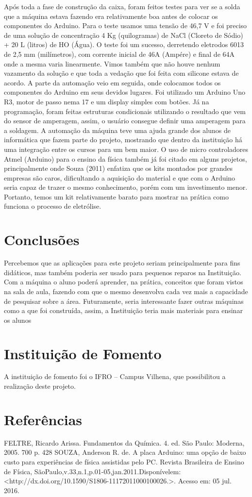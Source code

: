 \documentclass[article,12pt,onesidea,4paper,english,brazil]{abntex2}
\begin{document}
Após toda a fase de construção da caixa, foram feitos testes para ver se a
solda que a máquina estava fazendo era relativamente boa antes de colocar os
componentes do Arduino. Para o teste usamos uma tensão de 46,7 V e foi preciso de uma solução de concentração 4 Kg (quilogramas) de NaCl (Cloreto
de Sódio) + 20 L (litros) de HO (Água). O teste foi um sucesso, derretendo
eletrodos 6013 de 2,5 mm (milímetros), com corrente inicial de 46A (Ampére) e
final de 64A onde a mesma varia linearmente. Vimos também que não houve
nenhum vazamento da solução e que toda a vedação que foi feita com silicone
estava de acordo.
A parte da automação veio em seguida, onde colocamos todos os
componentes do Arduino em seus devidos lugares. Foi utilizado um Arduino
Uno R3, motor de passo nema 17 e um display simples com botões. Já na
programação, foram feitas estruturas condicionais utilizando o resultado que
vem do sensor de amperagem, assim, o usuário consegue definir uma
amperagem para a soldagem.
A automação da máquina teve uma ajuda grande dos alunos de
informática que fazem parte do projeto, mostrando que dentro da instituição há
uma integração entre os cursos para um bem maior.
O uso de micro controladores Atmel (Arduino) para o ensino da física
também já foi citado em alguns projetos, principalmente onde Souza (2011)
enfatiza que os kits montados por grandes empresas são caros, dificultando a
aquisição do material e que com o Arduino seria capaz de trazer o mesmo
conhecimento, porém com um investimento menor.
Portanto, temos um kit relativamente barato para mostrar na prática como
funciona o processo de eletrólise.
	\section*{Conclusões}
	
	Percebemos que as aplicações para este projeto seriam principalmente para
	fins didáticos, mas também poderia ser usado para pequenos reparos na Instituição.
	Com a máquina o aluno poderá aprender, na prática, conceitos que foram vistos na
	sala de aula, fazendo com que o mesmo desenvolva cada vez mais a capacidade de
	pesquisar sobre a área. Futuramente, seria interessante fazer outras máquinas
	como a que foi construída, assim, a Instituição teria mais materiais para ensinar os
	alunos

	\section*{Instituição de Fomento}
	A instituição de fomento foi o IFRO – Campus Vilhena, que possibilitou a
	realização deste projeto.
	
	\section*{Referências}
	
	FELTRE, Ricardo Arissa. Fundamentos da Química. 4. ed. São Paulo: Moderna,
	2005. 700 p. 428
	SOUZA, Anderson R. de. A placa Arduino: uma opção de baixo custo para
	experiências de física assistidas pelo PC. Revista Brasileira de Ensino de
	Física, SãoPaulo,v.33,n.1,p.01-05,jan.2011.Disponívelem:
	<http://dx.doi.org/10.1590/S1806-11172011000100026.>. Acesso em: 05 jul. 2016.
\end{document}
